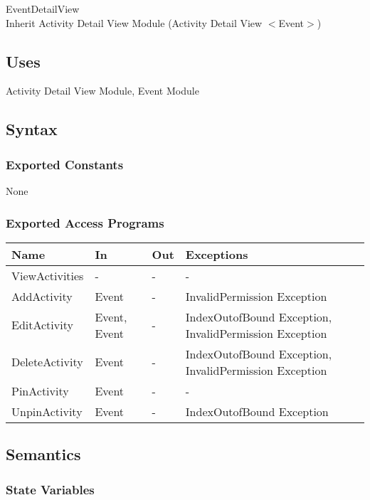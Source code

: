 \documentclass[12pt, titlepage]{article}
\begin{document}
EventDetailView\\
Inherit Activity Detail View Module (Activity Detail View $<$Event$>$)
\subsection{Uses}

Activity Detail View Module, Event Module

\subsection{Syntax}

\subsubsection{Exported Constants}

None

\subsubsection{Exported Access Programs}
\begin{center}
\begin{tabular}{p{4cm} p{2cm} p{4cm} p{4cm}}
\hline
\textbf{Name} & \textbf{In} & \textbf{Out} & \textbf{Exceptions} \\
\hline
ViewActivities & - & - & - \\
AddActivity & Event & - & InvalidPermission Exception \\
EditActivity & Event, Event & - & IndexOutofBound Exception, InvalidPermission Exception \\
DeleteActivity & Event & - & IndexOutofBound Exception, InvalidPermission Exception \\
PinActivity & Event & - & - \\
UnpinActivity & Event & - & IndexOutofBound Exception \\
\hline
\end{tabular}
\end{center}

\subsection{Semantics}

\subsubsection{State Variables}
\end{document}
